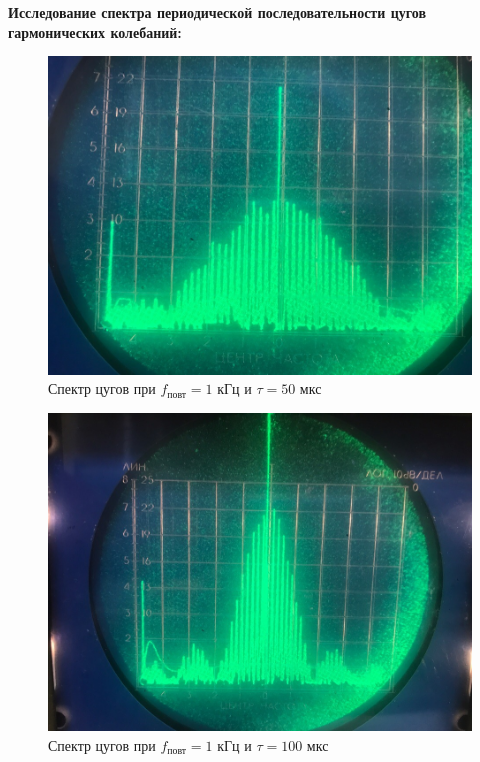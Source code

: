 \documentclass[a4paper, fontsize=14pt]{article}
\begin{document}
\textbf{Исследование спектра периодической последовательности цугов гармонических колебаний:}
\begin{figure}[H]
\center
\includegraphics[scale=0.3]{4.jpg}
\caption{Спектр цугов при $f_\text{повт} = 1$ кГц и $\tau = 50$ мкс}
\end{figure}
\begin{figure}[H]
\center
\includegraphics[scale=0.3]{5.jpg}
\caption{Спектр цугов при $f_\text{повт} = 1$ кГц и $\tau = 100$ мкс}
\end{figure}
\end{document}
